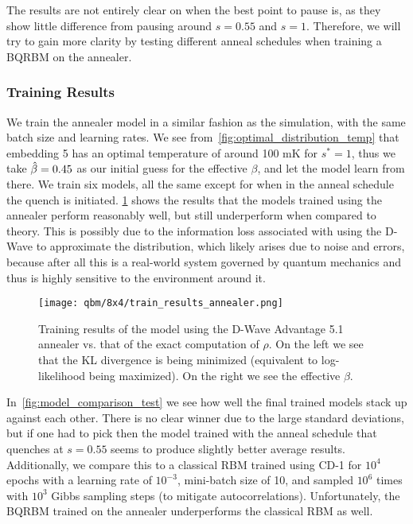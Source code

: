 The results are not entirely clear on when the best point to pause is, as they show little difference from pausing around \( s = 0.55 \) and \( s = 1 \).
Therefore, we will try to gain more clarity by testing different anneal schedules when training a BQRBM on the annealer.

\subsubsection{Training Results}
We train the annealer model in a similar fashion as the simulation, with the same batch size and learning rates.
We see from~\cref{fig:optimal_distribution_temp} that embedding 5 has an optimal temperature of around 100 \si{\milli\kelvin} for \( s^* = 1 \), thus we take \( \hat{\beta} = 0.45 \) as our initial guess for the effective \( \beta \), and let the model learn from there.
We train six models, all the same except for when in the anneal schedule the quench is initiated.
\cref{fig:train_results_annealer} shows the results that the models trained using the annealer perform reasonably well, but still underperform when compared to theory.
This is possibly due to the information loss associated with using the D-Wave to approximate the distribution, which likely arises due to noise and errors, because after all this is a real-world system governed by quantum mechanics and thus is highly sensitive to the environment around it.
\begin{figure}[!htb]
    \begin{center}
        \texttt{[image: qbm/8x4/train\_results\_annealer.png]}
    \end{center}
    \caption{Training results of the model using the D-Wave Advantage 5.1 annealer vs. that of the exact computation of \( \rho \). On the left we see that the KL divergence is being minimized (equivalent to log-likelihood being maximized). On the right we see the effective \( \beta \).}
    \label{fig:train_results_annealer}
\end{figure}

In~\cref{fig:model_comparison_test} we see how well the final trained models stack up against each other.
There is no clear winner due to the large standard deviations, but if one had to pick then the model trained with the anneal schedule that quenches at \( s = 0.55 \) seems to produce slightly better average results.
Additionally, we compare this to a classical RBM trained using CD-1 for \( 10^4 \) epochs with a learning rate of \( 10^{-3} \), mini-batch size of 10, and sampled \( 10^6 \) times with \( 10^3 \) Gibbs sampling steps (to mitigate autocorrelations).
Unfortunately, the BQRBM trained on the annealer underperforms the classical RBM as well.

